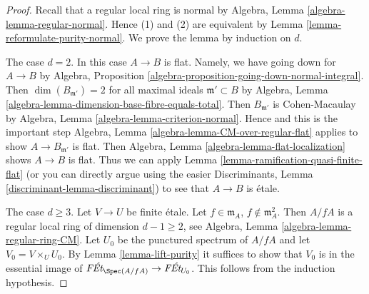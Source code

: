 \begin{proof}
Recall that a regular local ring is normal by
Algebra, Lemma \ref{algebra-lemma-regular-normal}.
Hence (1) and (2) are equivalent by
Lemma \ref{lemma-reformulate-purity-normal}.
We prove the lemma by induction on $d$.

\medskip\noindent
The case $d = 2$. In this case $A \to B$ is flat.
Namely, we have going down for $A \to B$ by
Algebra, Proposition \ref{algebra-proposition-going-down-normal-integral}.
Then $\dim(B_{\mathfrak m'}) = 2$ for all maximal ideals
$\mathfrak m' \subset B$ by
Algebra, Lemma \ref{algebra-lemma-dimension-base-fibre-equals-total}.
Then $B_{\mathfrak m'}$ is Cohen-Macaulay by
Algebra, Lemma \ref{algebra-lemma-criterion-normal}.
Hence and this is the important step
Algebra, Lemma \ref{algebra-lemma-CM-over-regular-flat}
applies to show $A \to B_{\mathfrak m'}$ is flat.
Then Algebra, Lemma \ref{algebra-lemma-flat-localization}
shows $A \to B$ is flat. Thus we can apply
Lemma \ref{lemma-ramification-quasi-finite-flat}
(or you can directly argue using the easier
Discriminants, Lemma \ref{discriminant-lemma-discriminant})
to see that $A \to B$ is \'etale.

\medskip\noindent
The case $d \geq 3$. Let $V \to U$ be finite \'etale.
Let $f \in \mathfrak m_A$, $f \not \in \mathfrak m_A^2$.
Then $A/fA$ is a regular local ring of dimension $d - 1 \geq 2$, see
Algebra, Lemma \ref{algebra-lemma-regular-ring-CM}.
Let $U_0$ be the punctured spectrum of $A/fA$ and let
$V_0 = V \times_U U_0$.
By Lemma \ref{lemma-lift-purity}
it suffices to show that $V_0$ is in the essential
image of $\textit{F\'Et}_{\Spec(A/fA)} \to \textit{F\'Et}_{U_0}$.
This follows from the induction hypothesis.
\end{proof}

